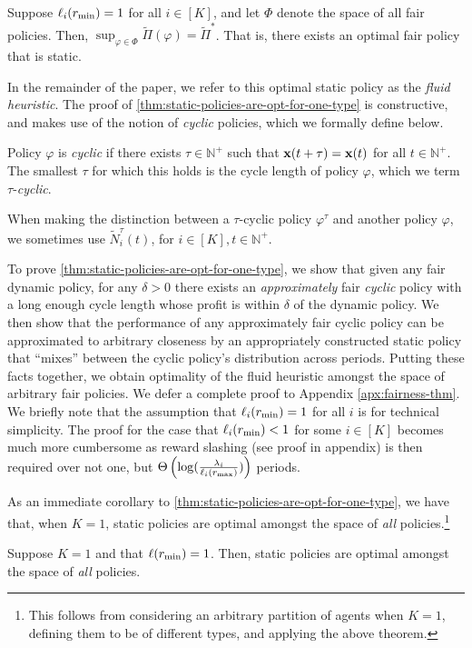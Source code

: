 \documentclass[12pt]{article}
\begin{document}
\begin{theorem}\label{thm:static-policies-are-opt-for-one-type}
Suppose $\ell_i(r_{\min}) = 1$ for all $i\in[K]$, and let ${\Phi}$ denote the space of all fair policies. Then, $\sup_{\varphi\in\Phi}\widetilde{\Pi}(\varphi) = \widetilde{\Pi}^*$. That is, there exists an optimal fair policy that is static.
\end{theorem} 

In the remainder of the paper, we refer to this optimal static policy as the \emph{fluid heuristic}. The proof of \cref{thm:static-policies-are-opt-for-one-type} is constructive, and makes use of the notion of {\it cyclic} policies, which we formally define below.

\begin{definition}\label{def:cyclic-pol}
Policy $\varphi$ is \emph{cyclic} if there exists $\tau \in \mathbb{N}^+$ such that $\mathbf{x}(t+\tau) = \mathbf{x}(t)$ for all $t \in \mathbb{N}^+$. The smallest $\tau$ for which this holds is the cycle length of policy $\varphi$, which we term $\tau$-\emph{cyclic}.
\end{definition}

When making the distinction between a $\tau$-cyclic policy $\varphi^\tau$ and another policy $\varphi$, we sometimes use $\widetilde{N}_i^{\tau}(t)$, for $i \in [K], t \in \mathbb{N}^+$.


To prove \cref{thm:static-policies-are-opt-for-one-type}, we show that given any fair dynamic policy, for any $\delta > 0$ there exists an {\it approximately} fair {\it cyclic} policy with a long enough cycle length whose profit is within $\delta$ of the dynamic policy. We then show that the performance of any approximately fair cyclic policy can be approximated to arbitrary closeness by an appropriately constructed static policy that ``mixes'' between the cyclic policy's distribution across periods. Putting these facts together, we obtain optimality of the fluid heuristic amongst the space of arbitrary fair policies. We defer a complete proof to Appendix \ref{apx:fairness-thm}. We briefly note that the assumption that $\ell_i(r_{\min}) = 1$ for all $i$ is for technical simplicity. The proof for the case that $\ell_i(r_{\min}) < 1$ for some $i \in [K]$ becomes much more cumbersome as reward slashing (see proof in appendix) is then required over not one, but $\Theta\left(\log(\frac{\lambda_i}{\ell_i(r_{\max})})\right)$ periods.

As an immediate corollary to \cref{thm:static-policies-are-opt-for-one-type}, we have that, when $K=1$, static policies are optimal amongst the space of {\it all} policies.\footnote{This follows from considering an arbitrary partition of agents when $K=1$, defining them to be of different types, and applying the above theorem.}
\begin{corollary}
Suppose $K = 1$ and that $\ell(r_{\min}) = 1$. Then, static policies are optimal amongst the space of \emph{all} policies. 
\end{corollary}
\end{document}
